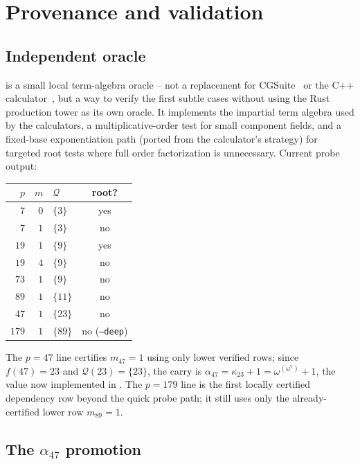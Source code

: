 \documentclass[11pt]{article}
\theoremstyle{plain}
\theoremstyle{definition}
\newcommand{\Qset}{\mathcal{Q}}
\begin{document}
\section{Provenance and validation}\label{sec:provenance}

\subsection{Independent oracle}

 is a small local term-algebra
oracle -- not a replacement for CGSuite~\cite{CGSuite} or the C++
calculator~\cite{Peeters}, but a way to verify the first subtle cases
without using the Rust production tower as its own oracle. It implements
the impartial term algebra used by the calculators, a
multiplicative-order test for small component fields, and a fixed-base
exponentiation path (ported from the calculator's strategy) for targeted
root tests where full order factorization is unnecessary. Current probe
output:

\begin{center}
\begin{tabular}{rrlc}
\toprule
$p$ & $m$ & $\Qset$ & root? \\
\midrule
$7$  & $0$ & $\{3\}$  & yes \\
$7$  & $1$ & $\{3\}$  & no \\
$19$ & $1$ & $\{9\}$  & yes \\
$19$ & $4$ & $\{9\}$  & no \\
$73$ & $1$ & $\{9\}$  & no \\
$89$ & $1$ & $\{11\}$ & no \\
$47$ & $1$ & $\{23\}$ & no \\
$179$ & $1$ & $\{89\}$ & no \quad(\texttt{--deep}) \\
\bottomrule
\end{tabular}
\end{center}

The $p=47$ line certifies $m_{47}=1$ using only lower verified rows; since
$f(47)=23$ and $\Qset(23)=\{23\}$, the carry is
$\alpha_{47}=\kappa_{23}+1=\omega^{(\omega^7)}+1$, the value now
implemented in . The $p=179$ line is the first locally
certified dependency row beyond the quick probe path; it still uses only
the already-certified lower row $m_{89}=1$.

\subsection{The $\alpha_{47}$ promotion}
\end{document}
